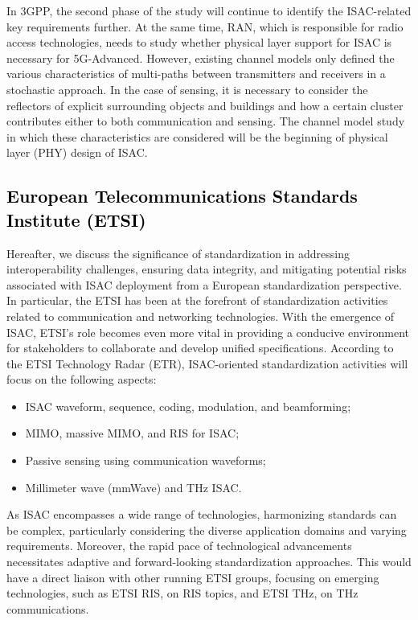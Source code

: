 \documentclass[journal, comsoc]{IEEEtran}
\begin{document}
In 3GPP, the second phase of the study will continue to identify the ISAC-related key requirements further. At the same time, RAN, which is responsible for radio access technologies, needs to study whether physical layer support for ISAC is necessary for 5G-Advanced. However, existing channel models only defined the various characteristics of multi-paths between transmitters and receivers in a stochastic approach. In the case of sensing, it is necessary to consider the reflectors of explicit surrounding objects and buildings and how a certain cluster contributes either to both communication and sensing. The channel model study in which these characteristics are considered will be the beginning of physical layer (PHY) design of ISAC. 

\subsection{\textcolor{black}{European Telecommunications Standards Institute (ETSI) }}
\label{sec:3.2}
Hereafter, we discuss the significance of standardization in addressing interoperability challenges, ensuring data integrity, and mitigating potential risks associated with ISAC deployment from a European standardization perspective. In particular, the ETSI has been at the forefront of standardization activities related to communication and networking technologies. With the emergence of ISAC, ETSI's role becomes even more vital in providing a conducive environment for stakeholders to collaborate and develop unified specifications.
According to the ETSI Technology Radar (ETR), ISAC-oriented standardization activities will focus on the following aspects:
\begin{itemize}
    \item ISAC waveform, sequence, coding, modulation, and beamforming;
    \item MIMO, massive MIMO, and RIS for ISAC;
    \item Passive sensing using communication waveforms;
    \item Millimeter wave (mmWave) and THz ISAC.
\end{itemize}

As ISAC encompasses a wide range of technologies, harmonizing standards can be complex, particularly considering the diverse application domains and varying requirements. Moreover, the rapid pace of technological advancements necessitates adaptive and forward-looking standardization approaches. This would have a direct liaison with other running ETSI groups, focusing on emerging technologies, such as ETSI RIS, on RIS topics, and ETSI THz, on THz communications.
\end{document}
